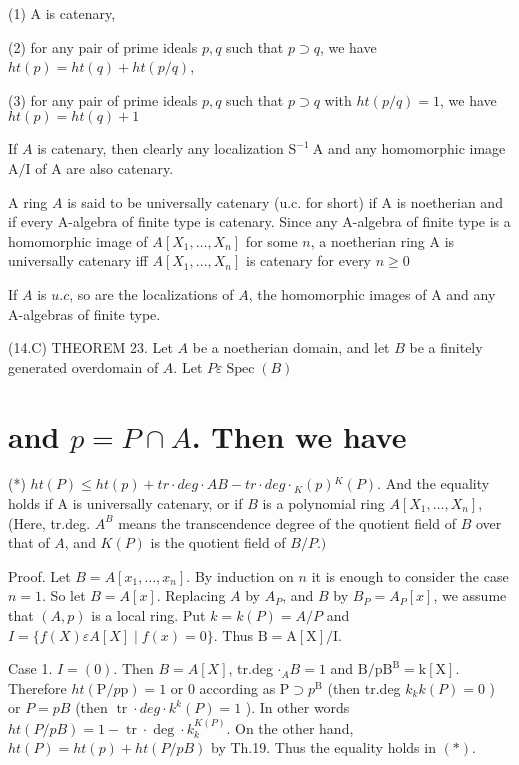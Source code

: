 (1) A is catenary,

(2) for any pair of prime ideals $p, q$ such that $p \supset q$, we have $h t(p)=h t(q)+h t(p / q)$,

(3) for any pair of prime ideals $p, q$ such that $p \supset q$ with $h t(p / q)=1$, we have $h t(p)=h t(q)+1$

If $A$ is catenary, then clearly any localization $\mathrm{S}^{-1} \mathrm{~A}$ and any homomorphic image $\mathrm{A} / \mathrm{I}$ of $\mathrm{A}$ are also catenary.

A ring $A$ is said to be universally catenary (u.c. for short) if A is noetherian and if every A-algebra of finite type is catenary. Since any A-algebra of finite type is a homomorphic image of $A\left[X_{1}, \ldots, X_{n}\right]$ for some $n$, a noetherian ring A is universally catenary iff $A\left[X_{1}, \ldots, X_{n}\right]$ is catenary for every $n \geqslant 0$

If $A$ is $u . c$, so are the localizations of $A$, the homomorphic images of A and any A-algebras of finite type.

(14.C) THEOREM 23. Let $A$ be a noetherian domain, and let $B$ be a finitely generated overdomain of $A$. Let $P \varepsilon \operatorname{Spec}(B)$

\section{and $p=P \cap A$. Then we have}
(*) $h t(P) \leqslant h t(p)+t r \cdot d e g \cdot A B-t r \cdot d e g \cdot{ }_{K}(p){ }^{K}(P) .$ And the equality holds if A is universally catenary, or if $B$ is a polynomial ring $A\left[X_{1}, \ldots, X_{n}\right]$, (Here, tr.deg. $A^{B}$ means the transcendence degree of the quotient field of $B$ over that of $A$, and $K(P)$ is the quotient field of $B / P .)$

Proof. Let $B=A\left[x_{1}, \ldots, x_{n}\right]$. By induction on $n$ it is enough to consider the case $n=1$. So let $B=A[x]$. Replacing $A$ by $A_{P}$, and $B$ by $B_{P}=A_{P}[x]$, we assume that $(A, p)$ is a local ring. Put $k=k(P)=A / P$ and $I=\{f(X) \varepsilon A[X] \mid f(x)=0\}$. Thus $\mathrm{B}=\mathrm{A}[\mathrm{X}] / \mathrm{I}$.

Case 1. $I=(0)$. Then $B=A[X]$, tr.deg $\cdot{ }_{A} B=1$ and $\mathrm{B} / \mathrm{pB}^{\mathrm{B}}=\mathrm{k}[\mathrm{X}]$. Therefore $h t(\mathrm{P} / p \mathrm{p})=1$ or 0 according as $\mathrm{P} \supset p^{\mathrm{B}}$ (then tr.deg $k_{k} k(P)=0$ ) or $P=p B$ (then $\operatorname{tr} \cdot d e g \cdot k^{k}(P)=1$ ). In other words $h t(P / p B)=1-\operatorname{tr} \cdot \operatorname{deg} \cdot k_{k}^{K(P)}$. On the other hand, $h t(P)=h t(p)+h t(P / p B)$ by Th.19. Thus the equality holds in $(*)$.

